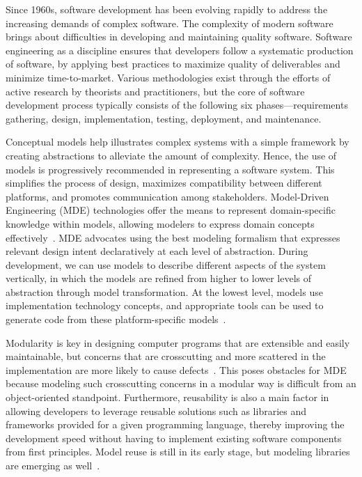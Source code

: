 Since 1960s, software development has been evolving rapidly to address the increasing demands of complex software. The complexity of modern software brings about difficulties in developing and maintaining quality software. Software engineering as a discipline ensures that developers follow a systematic production of software, by applying best practices to maximize quality of deliverables and minimize time-to-market. Various methodologies exist through the efforts of active research by theorists and practitioners, but the core of software development process typically consists of the following six phases---requirements gathering, design, implementation, testing, deployment, and maintenance.

Conceptual models help illustrates complex systems with a simple framework by creating abstractions to alleviate the amount of complexity. Hence, the use of models is progressively recommended in representing a software system. This simplifies the process of design, maximizes compatibility between different platforms, and promotes communication among stakeholders. Model-Driven Engineering (MDE) technologies offer the means to represent domain-specific knowledge within models, allowing modelers to express domain concepts effectively~\cite{schmidt2006model}. MDE advocates using the best modeling formalism that expresses relevant design intent declaratively at each level of abstraction. During development, we can use models to describe different aspects of the system vertically, in which the models are refined from higher to lower levels of abstraction through model transformation. At the lowest level, models use implementation technology concepts, and appropriate tools can be used to generate code from these platform-specific models~\cite{sendall2003model}.

Modularity is key in designing computer programs that are extensible and easily maintainable, but concerns that are crosscutting and more scattered in the implementation are more likely to cause defects~\cite{eaddy2008crosscutting}. This poses obstacles for MDE because modeling such crosscutting concerns in a modular way is difficult from an object-oriented standpoint. Furthermore, reusability is also a main factor in allowing developers to leverage reusable solutions such as libraries and frameworks provided for a given programming language, thereby improving the development speed without having to implement existing software components from first principles. Model reuse is still in its early stage, but modeling libraries are emerging as well~\cite{france2012repository}.

